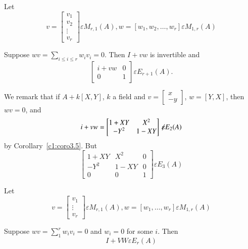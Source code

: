 \begin{coro}\label{c1:coro4.3}
Let 
$$
v=
\begin{bmatrix}
v_1\\
v_2\\
\vdots\\
v_r
\end{bmatrix} \varepsilon M_{r,1}(A),w=[w_1,w_2,\ldots,w_r]\varepsilon M_{1,r}(A)
$$

Suppose $wv=\sum\limits_{i\leq i\leq r} w_iv_i=0$. Then $I+vw$ is
invertible and 
$$
\begin{bmatrix}
i+vw & 0\\
0 & 1
\end{bmatrix} \varepsilon E_{r+1}(A).
$$

We remark that if $A+k[X,Y]$, $k$ a field and $v=\begin{bmatrix}
x\\
-y
\end{bmatrix}$, $w=[Y,X]$, then $wv=0$, and 
$$
i+vw=
\begin{bmatrix}
1+XY & X^{2}\\
-Y^{2} & 1-XY
\end{bmatrix} \not\kern-2pt\varepsilon E_2(A)
$$
by Corollary~\ref{c1:coro3.5}. But 
$$
\begin{bmatrix}
1+XY & X^{2} & 0\\
-Y^{2} & 1-XY & 0\\
0 & 0 & 1
\end{bmatrix} \varepsilon E_3(A)
$$
\end{coro}

\begin{coro}\label{c1:coro4.4}
Let 
$$
v=\begin{bmatrix}
v_1\\
\vdots\\
v_r
\end{bmatrix} \varepsilon M_{r, 1}(A),w=[w_1,\ldots,w_r]\varepsilon M_{1,r}(A)
$$

Suppose $wv=\sum\limits_{1}^{r}w_iv_i=0$ and $w_i=0$ for some
$i$. Then 
$$
I+VW\varepsilon E_r(A)
$$
\end{coro}

